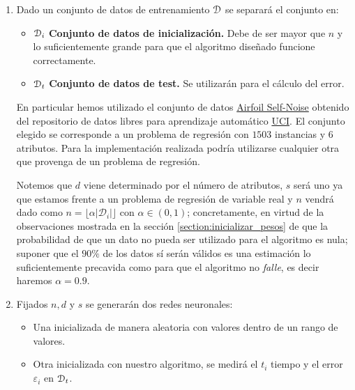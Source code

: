 \begin{enumerate}
\item Dado un conjunto de datos de entrenamiento $\mathcal{D}$  se separará el conjunto en:
\begin{itemize}
    \item $\mathcal{D}_i$ \textbf{Conjunto de 
    datos de inicialización.} Debe de ser mayor que 
    $n$ y lo suficientemente grande para que el algoritmo diseñado funcione correctamente. 

    \item $\mathcal{D}_t$ \textbf{Conjunto de 
    datos de test.} Se utilizarán para el cálculo del error. 
\end{itemize} 

En particular hemos utilizado el conjunto de datos \href{https://archive.ics.uci.edu/ml/datasets/Airfoil+Self-Noise
    }{
        Airfoil Self-Noise} obtenido del repositorio de datos libres para aprendizaje automático \href{https://archive.ics.uci.edu/ml/datasets.php}{UCI}. 
El conjunto elegido se corresponde a un problema de regresión con $1503$ instancias y $6$ atributos. 
Para la implementación realizada podría utilizarse cualquier otra que provenga de un problema de regresión. 

Notemos que $d$ viene determinado por el número de atributos, 
$s$ será uno ya que estamos frente a un problema 
de regresión de variable real y $n$ vendrá dado como $n = \lfloor \alpha |\mathcal{D}_i| \rfloor$ con $\alpha \in (0,1)$; concretamente, en virtud de la observaciones mostrada en la sección \ref{section:inicializar_pesos} de que la probabilidad de que un dato no pueda ser utilizado para el algoritmo es nula; suponer que el $90\%$ de los datos sí serán válidos es una estimación lo suficientemente precavida como para que el algoritmo no \textit{falle}, es decir haremos    $\alpha = 0.9$. 

\item Fijados $n, d$ y $s$ se generarán dos redes neuronales: 

\begin{itemize}
    \item Una inicializada de manera aleatoria con valores dentro de un rango de valores. 
    
    \item  Otra inicializada con nuestro algoritmo, se medirá el $t_i$ tiempo y el error $\varepsilon_i$ en  $\mathcal{D}_t$. 
\end{itemize}


\end{enumerate}

